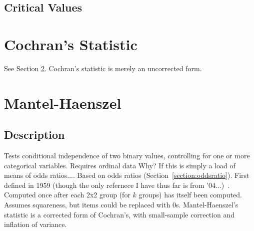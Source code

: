 \documentclass[11pt]{article}
\begin{document}
\subsection{Critical Values}













\section{Cochran's Statistic}
See Section \ref{section:mantelhaenszel}.  Cochran's statistic is merely an uncorrected form.

\section{Mantel-Haenszel}
\label{section:mantelhaenszel}
\subsection{Description}
Tests conditional independence of two binary values, controlling for one or more categorical variables.  
Requires ordinal data {\color{red} Why? If this is simply a load of means of odds ratios...}.  
Based on odds ratios (Section~\ref{section:oddsratio}).  
First defined in 1959 {\color{red} (though the only refernece I have thus far is from '04...)}~\cite{mantel2004statistical}.  
Computed once after each 2x2 group (for $k$ groups) has itself been computed.  
Assumes squareness, but items could be replaced with 0s.
Mantel-Haenszel's statistic is a corrected form of Cochran's, with small-sample correction and inflation of variance.
\end{document}

